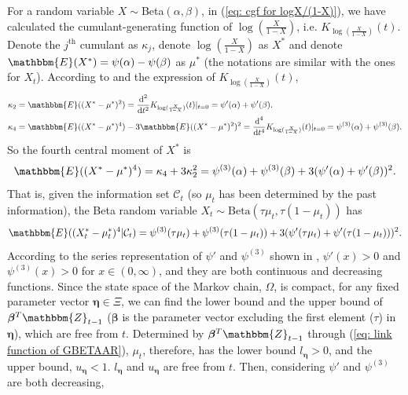 \documentclass{article}
\theoremstyle{definition}
\begin{document}
For a random variable $X\sim $Beta$(\alpha,\beta)$, in (\ref{eq: cgf for logX/(1-X)}), we have calculated the cumulant-generating function of $\log(\frac{X}{1-X})$, i.e. $K_{\log(\frac{X}{1-X})}(t)$. Denote the $j^{\text{th}}$ cumulant as $\kappa_j$, denote $\log(\frac{X}{1-X})$ as $X^*$ and denote $\mathbbm{E}(X^*) = \psi(\alpha)-\psi(\beta)$ as $\mu^*$ (the notations are similar with the ones for $X_t$). According to \cite{dodge1999complications} and the expression of $K_{\log(\frac{X}{1-X})}(t)$, 
\begin{equation*}
\begin{aligned}
    \kappa_2 &= \mathbbm{E}((X^*- \mu^*)^2) = \frac{\text{d}^2}{\text{d}t^2}K_{\log(\frac{X}{1-X})}(t)|_{t=0} = \psi'(\alpha)+ \psi'(\beta). \\
    \kappa_4 &= \mathbbm{E}((X^*- \mu^*)^4)-3\mathbbm{E}((X^*- \mu^*)^2)^2 = \frac{\text{d}^4}{\text{d}t^4}K_{\log(\frac{X}{1-X})}(t)|_{t=0} = \psi^{(3)}(\alpha)+ \psi^{(3)}(\beta).
\end{aligned}
\end{equation*}
So the fourth central moment of $X^*$ is 
\begin{equation*}
    \mathbbm{E}((X^*- \mu^*)^4) = \kappa_4+3 \kappa_2^2 = \psi^{(3)}(\alpha)+ \psi^{(3)}(\beta)+3 (\psi'(\alpha)+ \psi'(\beta))^2.
\end{equation*}
That is, given the information set $\mathcal{C}_t$ (so $\mu_t$ has been determined by the past information), the Beta random variable $X_t\sim \text{Beta}(\tau \mu_t, \tau (1-\mu_t))$ has 
\begin{equation*}
   \mathbbm{E}((X_t^*-\mu_t^*)^4|\mathcal{C}_t) = \psi^{(3)}(\tau \mu_t)+ \psi^{(3)}(\tau (1-\mu_t))+3 (\psi'(\tau \mu_t)+ \psi'(\tau (1-\mu_t)))^2.
\end{equation*}
According to the series representation of $\psi'$ and $\psi^{(3)}$ shown in \cite{batir2007some}, $\psi'(x)>0$ and $\psi^{(3)}(x)>0$ for $x \in (0,\infty)$, and they are both continuous and decreasing functions. Since the state space of the Markov chain, $\Omega$, is compact, for any fixed parameter vector $\bm{\eta} \in \Xi$, we can find the lower bound and the upper bound of $\bm{\beta}^T \mathbbm{Z}_{t-1}$ ($\bm{\beta}$ is the parameter vector excluding the first element ($\tau$) in $\bm{\eta}$), which are free from $t$. Determined by $\bm{\beta}^T \mathbbm{Z}_{t-1}$ through (\ref{eq: link function of GBETAAR}), $\mu_t$, therefore, has the lower bound $l_{\bm{\eta}}>0$, and the upper bound, $u_{\bm{\eta}}<1$. $l_{\bm{\eta}}$ and $u_{\bm{\eta}}$ are free from $t$. Then, considering $\psi'$ and $\psi^{(3)}$ are both decreasing,
\end{document}
